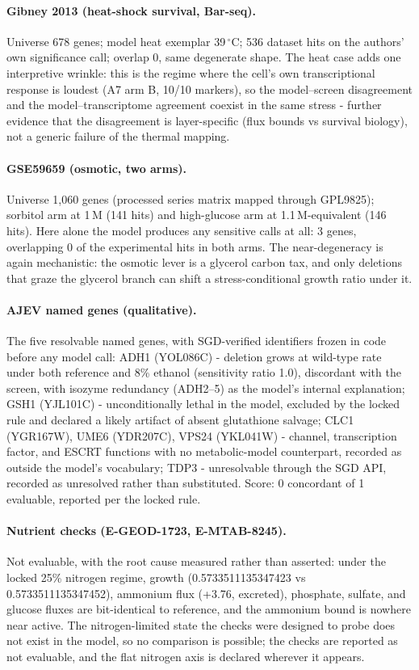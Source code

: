 \documentclass[12pt]{article}
\begin{document}
\paragraph{Gibney 2013 (heat-shock survival, Bar-seq).} Universe 678
genes; model heat exemplar 39\,$^{\circ}$C; 536 dataset hits on the
authors' own significance call; overlap 0, same degenerate shape.
The heat case adds one interpretive wrinkle: this is the regime where
the cell's own transcriptional response is loudest (A7 arm B,
10/10 markers), so the model--screen disagreement and the
model--transcriptome agreement coexist in the same stress - further
evidence that the disagreement is layer-specific (flux bounds vs
survival biology), not a generic failure of the thermal mapping.

\paragraph{GSE59659 (osmotic, two arms).} Universe 1{,}060 genes
(processed series matrix mapped through GPL9825); sorbitol arm at
1\,M (141 hits) and high-glucose arm at 1.1\,M-equivalent (146 hits).
Here alone the model produces any sensitive calls at all: 3 genes,
overlapping 0 of the experimental hits in both arms. The
near-degeneracy is again mechanistic: the osmotic lever is a glycerol
carbon tax, and only deletions that graze the glycerol branch can
shift a stress-conditional growth ratio under it.

\paragraph{AJEV named genes (qualitative).} The five resolvable named
genes, with SGD-verified identifiers frozen in code before any model
call: ADH1 (YOL086C) - deletion grows at wild-type rate under both
reference and 8\% ethanol (sensitivity ratio 1.0), discordant with
the screen, with isozyme redundancy (ADH2--5) as the model's internal
explanation; GSH1 (YJL101C) - unconditionally lethal in the model,
excluded by the locked rule and declared a likely artifact of absent
glutathione salvage; CLC1 (YGR167W), UME6 (YDR207C), VPS24 (YKL041W)
- channel, transcription factor, and ESCRT functions with no
metabolic-model counterpart, recorded as outside the model's
vocabulary; TDP3 - unresolvable through the SGD API, recorded as
unresolved rather than substituted. Score: 0 concordant of 1
evaluable, reported per the locked rule.

\paragraph{Nutrient checks (E-GEOD-1723, E-MTAB-8245).} Not evaluable,
with the root cause measured rather than asserted: under the locked
25\% nitrogen regime, growth (0.5733511135347423 vs
0.5733511135347452), ammonium flux (+3.76, excreted), phosphate,
sulfate, and glucose fluxes are bit-identical to reference, and the
ammonium bound is nowhere near active. The nitrogen-limited state the
checks were designed to probe does not exist in the model, so no
comparison is possible; the checks are reported as not evaluable, and
the flat nitrogen axis is declared wherever it appears.
\end{document}
